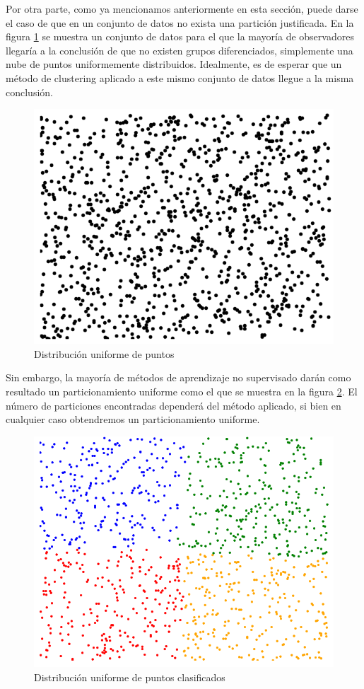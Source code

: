 Por otra parte, como ya mencionamos anteriormente en esta sección, puede darse el caso de que en un conjunto de datos no exista una partición justificada. En la figura \ref{fig:figure2} se muestra un conjunto de datos para el que la mayoría de observadores llegaría a la conclusión de que no existen grupos diferenciados, simplemente una nube de puntos uniformemente distribuidos. Idealmente, es de esperar que un método de clustering aplicado a este mismo conjunto de datos llegue a la misma conclusión.

\begin{figure}[!h]
	\centering
	\includegraphics[scale=0.2]{imagenes/c2/rand.png} 
	\caption{Distribución uniforme de puntos}\label{fig:figure2}
\end{figure}

Sin embargo, la mayoría de métodos de aprendizaje no supervisado darán como resultado un particionamiento uniforme como el que se muestra en la figura \ref{fig:figure3}. El número de particiones encontradas dependerá del método aplicado, si bien en cualquier caso obtendremos un particionamiento uniforme.

\begin{figure}[!h]
	\centering
	\includegraphics[scale=0.2]{imagenes/c2/randClasif.png} 
	\caption{Distribución uniforme de puntos clasificados}\label{fig:figure3}
\end{figure}

